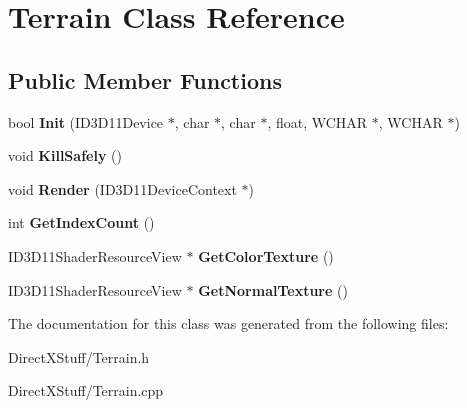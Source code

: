 \hypertarget{class_terrain}{\section{Terrain Class Reference}
\label{class_terrain}
}
\subsection*{Public Member Functions}
\begin{DoxyCompactItemize}
\item 
\hypertarget{class_terrain_a302fbdad9fd7015075e3dafed96c01d2}{bool {\bfseries Init} (I\-D3\-D11\-Device $\ast$, char $\ast$, char $\ast$, float, W\-C\-H\-A\-R $\ast$, W\-C\-H\-A\-R $\ast$)}\label{class_terrain_a302fbdad9fd7015075e3dafed96c01d2}

\item 
\hypertarget{class_terrain_ac4289130ef97443136ea2f5153bd5ac9}{void {\bfseries Kill\-Safely} ()}\label{class_terrain_ac4289130ef97443136ea2f5153bd5ac9}

\item 
\hypertarget{class_terrain_adf9f92aa9a0cbe9f9eafac5af50334c6}{void {\bfseries Render} (I\-D3\-D11\-Device\-Context $\ast$)}\label{class_terrain_adf9f92aa9a0cbe9f9eafac5af50334c6}

\item 
\hypertarget{class_terrain_adf3d72e2b093375f9aa138841c37443b}{int {\bfseries Get\-Index\-Count} ()}\label{class_terrain_adf3d72e2b093375f9aa138841c37443b}

\item 
\hypertarget{class_terrain_aba1f8d5e2be340330a9b97ae2e17d805}{I\-D3\-D11\-Shader\-Resource\-View $\ast$ {\bfseries Get\-Color\-Texture} ()}\label{class_terrain_aba1f8d5e2be340330a9b97ae2e17d805}

\item 
\hypertarget{class_terrain_aa40bc1f5c522e86f2704a56e5a0814a7}{I\-D3\-D11\-Shader\-Resource\-View $\ast$ {\bfseries Get\-Normal\-Texture} ()}\label{class_terrain_aa40bc1f5c522e86f2704a56e5a0814a7}

\end{DoxyCompactItemize}


The documentation for this class was generated from the following files\-:\begin{DoxyCompactItemize}
\item 
Direct\-X\-Stuff/Terrain.\-h\item 
Direct\-X\-Stuff/Terrain.\-cpp\end{DoxyCompactItemize}
